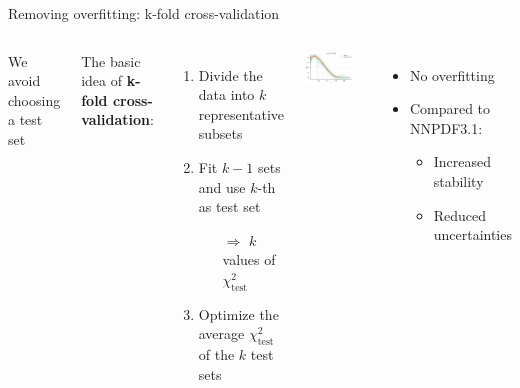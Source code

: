 \documentclass[aspectratio=169,10pt]{beamer}
\begin{document}
\begin{frame}{Removing overfitting: k-fold cross-validation}

\begin{columns}
We avoid choosing a test set\\
\vspace*{2em}

The basic idea of \textbf{k-fold cross-validation}:
\begin{enumerate}
    \item Divide the data into $k$ {representative subsets}
    \item Fit $k-1$ sets and use $k$-th as test set
    \begin{itemize}
        \item[$\Rightarrow$] $k$ values of $\chi^2_\mathrm{test}$
    \end{itemize}
    \item Optimize the average $\chi^2_\mathrm{test}$ of the $k$ test sets
\end{enumerate}



\includegraphics[width=0.8\textwidth]{methodology/best_model_vs_nnpdf31}

\begin{itemize}
     \item No overfitting\\
     \vspace*{0.2em}
     \item Compared to NNPDF3.1:
    \begin{itemize}
        \item Increased stability
        \item Reduced uncertainties 
    \end{itemize}
\end{itemize}


\end{columns}
\end{frame}
\end{document}
